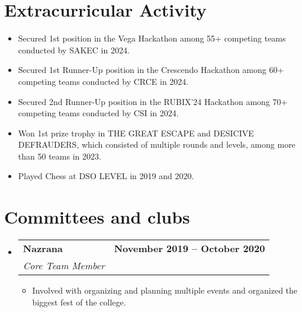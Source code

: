 \documentclass[letterpaper,11pt]{article}
\makeatletter
\newcommand{\resumeItem}[1]{
  \item\small{
    {#1 \vspace{-2pt}}
  }
}
\newcommand{\resumeSubheading}[4]{
  \vspace{-2pt}\item
    \begin{tabular*}{1.0\textwidth}[t]{l@{\extracolsep{\fill}}r}
      \vspace{-2pt}\textbf{#1} & \textbf{\small #2} \\
      \textit{\small#3} & \textit{\small #4} \\
    \end{tabular*}\vspace{-7pt}
}
\newcommand{\resumeSubHeadingListStart}{\begin{itemize}[leftmargin=0.0in, label={}]}
\newcommand{\resumeSubHeadingListEnd}{\end{itemize}}
\newcommand{\resumeItemListStart}{\begin{itemize}}
\newcommand{\resumeItemListEnd}{\end{itemize}\vspace{-5pt}}
\makeatother
\begin{document}
\section{Extracurricular Activity}
    \vspace{-2pt}
    
        \resumeItemListStart
            \resumeItem{Secured 1st position in the Vega Hackathon among 55+ competing teams conducted by SAKEC in 2024.}
            \resumeItem{Secured 1st Runner-Up position in the Crescendo Hackathon among 60+ competing teams conducted by CRCE in 2024.}
            \resumeItem{Secured 2nd Runner-Up position in the RUBIX'24 Hackathon among 70+ competing teams conducted by CSI in 2024.}
            \resumeItem{Won 1st prize trophy in THE GREAT ESCAPE and DESICIVE DEFRAUDERS, which consisted of multiple rounds and levels, among more than 50 teams in 2023.}
            \resumeItem{Played Chess at DSO LEVEL in 2019 and 2020.}
        \resumeItemListEnd
        \vspace{-6pt}
        
\vspace{-8pt}

\section{Committees and clubs}
    \vspace{-2pt}
    \resumeSubHeadingListStart
        \resumeSubheading
            {Nazrana}{November 2019 -- October 2020}
            {Core Team Member}{}
            \vspace{-7pt}
            \resumeItemListStart
                \resumeItem{Involved with organizing and planning multiple  events and organized the biggest fest of the college.}
            \resumeItemListEnd
            \vspace{-4pt}

    \resumeSubHeadingListEnd
\vspace{-12pt}
\end{document}
